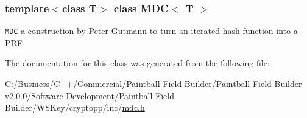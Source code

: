\subsubsection*{template$<$class T$>$ class MDC$<$ T $>$}

\href{http://www.weidai.com/scan-mirror/cs.html#MDC}{\tt MDC} a construction by Peter Gutmann to turn an iterated hash function into a PRF 

The documentation for this class was generated from the following file:\begin{DoxyCompactItemize}
\item 
C:/Business/C++/Commercial/Paintball Field Builder/Paintball Field Builder v2.0.0/Software Development/Paintball Field Builder/WSKey/cryptopp/inc/\hyperlink{mdc_8h}{mdc.h}\end{DoxyCompactItemize}
